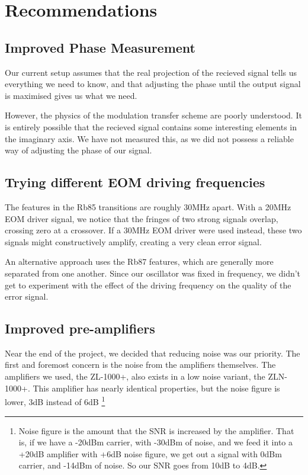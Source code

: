 \newpage

\section{Recommendations}

\subsection{Improved Phase Measurement}

Our current setup assumes that the real projection of the recieved signal tells us everything we need to know, and that adjusting the phase until the output signal is maximised gives us what we need.

However, the physics of the modulation transfer scheme are poorly understood.  It is entirely possible that the recieved signal contains some interesting elements in the imaginary axis.  We have not measured this, as we did not possess a reliable way of adjusting the phase of our signal.

\subsection{Trying different EOM driving frequencies}

The features in the Rb85 transitions are roughly 30MHz apart.  With a 20MHz EOM driver signal, we notice that the fringes of two strong signals overlap, crossing zero at a crossover.  If a 30MHz EOM driver were used instead, these two signals might constructively amplify, creating a very clean error signal.

An alternative approach uses the Rb87 features, which are generally more separated from one another.  Since our oscillator was fixed in frequency, we didn't get to experiment with the effect of the driving frequency on the quality of the error signal.

\subsection{Improved pre-amplifiers}

Near the end of the project, we decided that reducing noise was our priority.  The first and foremost concern is the noise from the amplifiers themselves.  The amplifiers we used, the ZL-1000+, also exists in a low noise variant, the ZLN-1000+.  This amplifier has nearly identical properties, but the noise figure is lower, 3dB instead of 6dB \footnote{Noise figure is the amount that the SNR is increased by the amplifier.  That is, if we have a -20dBm carrier, with -30dBm of noise, and we feed it into a +20dB amplifier with +6dB noise figure, we get out a signal with 0dBm carrier, and -14dBm of noise.  So our SNR goes from 10dB to 4dB.}


